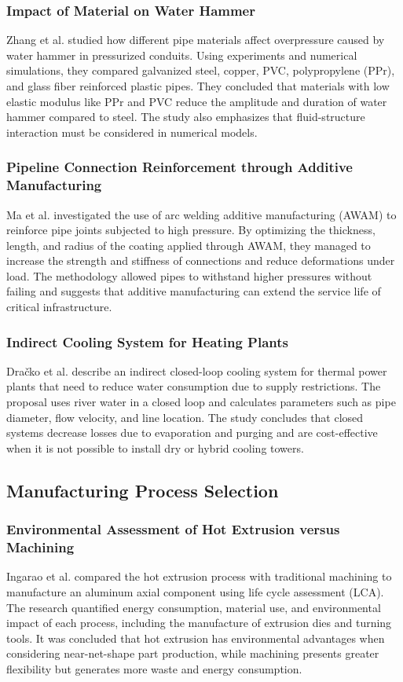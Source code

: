 \documentclass{article}
\begin{document}
\subsubsection*{Impact of Material on Water Hammer}
Zhang et al. \cite{zhang2024waterhammer} studied how different pipe materials affect overpressure caused by water hammer in pressurized conduits.
Using experiments and numerical simulations, they compared galvanized steel, copper, PVC, polypropylene (PPr), and glass fiber reinforced plastic pipes.
They concluded that materials with low elastic modulus like PPr and PVC reduce the amplitude and duration of water hammer compared to steel.
The study also emphasizes that fluid-structure interaction must be considered in numerical models.

\subsubsection*{Pipeline Connection Reinforcement through Additive Manufacturing}
Ma et al. \cite{ma2025awam} investigated the use of arc welding additive manufacturing (AWAM) to reinforce pipe joints subjected to high pressure.
By optimizing the thickness, length, and radius of the coating applied through AWAM, they managed to increase the strength and stiffness of connections and reduce deformations under load.
The methodology allowed pipes to withstand higher pressures without failing and suggests that additive manufacturing can extend the service life of critical infrastructure.

\subsubsection*{Indirect Cooling System for Heating Plants}
Dračko et al. \cite{dracko2024cooling} describe an indirect closed-loop cooling system for thermal power plants that need to reduce water consumption due to supply restrictions.
The proposal uses river water in a closed loop and calculates parameters such as pipe diameter, flow velocity, and line location.
The study concludes that closed systems decrease losses due to evaporation and purging and are cost-effective when it is not possible to install dry or hybrid cooling towers.

\subsection*{Manufacturing Process Selection}

\subsubsection*{Environmental Assessment of Hot Extrusion versus Machining}
Ingarao et al. \cite{ingarao2014lca} compared the hot extrusion process with traditional machining to manufacture an aluminum axial component using life cycle assessment (LCA).
The research quantified energy consumption, material use, and environmental impact of each process, including the manufacture of extrusion dies and turning tools.
It was concluded that hot extrusion has environmental advantages when considering near-net-shape part production, while machining presents greater flexibility but generates more waste and energy consumption.
\end{document}
